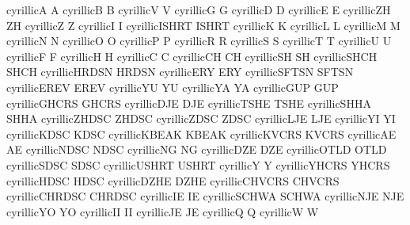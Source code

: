  cyrillicA      {A}
 cyrillicB      {B}
 cyrillicV      {V}
 cyrillicG      {G}
 cyrillicD      {D}
 cyrillicE      {E}
 cyrillicZH     {ZH}
 cyrillicZ      {Z}
 cyrillicI      {I}
 cyrillicISHRT  {ISHRT}
 cyrillicK      {K}
 cyrillicL      {L}
 cyrillicM      {M}
 cyrillicN      {N}
 cyrillicO      {O}
 cyrillicP      {P}
 cyrillicR      {R}
 cyrillicS      {S}
 cyrillicT      {T}
 cyrillicU      {U}
 cyrillicF      {F}
 cyrillicH      {H}
 cyrillicC      {C}
 cyrillicCH     {CH}
 cyrillicSH     {SH}
 cyrillicSHCH   {SHCH}
 cyrillicHRDSN  {HRDSN}
 cyrillicERY    {ERY}
 cyrillicSFTSN  {SFTSN}
 cyrillicEREV   {EREV}
 cyrillicYU     {YU}
 cyrillicYA     {YA}
 cyrillicGUP    {GUP}
 cyrillicGHCRS  {GHCRS}
 cyrillicDJE    {DJE}
 cyrillicTSHE   {TSHE}
 cyrillicSHHA   {SHHA}
 cyrillicZHDSC  {ZHDSC}
 cyrillicZDSC   {ZDSC}
 cyrillicLJE    {LJE}
 cyrillicYI     {YI}
 cyrillicKDSC   {KDSC}
 cyrillicKBEAK  {KBEAK}
 cyrillicKVCRS  {KVCRS}
 cyrillicAE     {AE}
 cyrillicNDSC   {NDSC}
 cyrillicNG     {NG}
 cyrillicDZE    {DZE}
 cyrillicOTLD   {OTLD}
 cyrillicSDSC   {SDSC}
 cyrillicUSHRT  {USHRT}
 cyrillicY      {Y}
 cyrillicYHCRS  {YHCRS}
 cyrillicHDSC   {HDSC}
 cyrillicDZHE   {DZHE}
 cyrillicCHVCRS {CHVCRS}
 cyrillicCHRDSC {CHRDSC}
 cyrillicIE     {IE}
 cyrillicSCHWA  {SCHWA}
 cyrillicNJE    {NJE}
 cyrillicYO     {YO}
 cyrillicII     {II}
 cyrillicJE     {JE}
 cyrillicQ      {Q}
 cyrillicW      {W}

